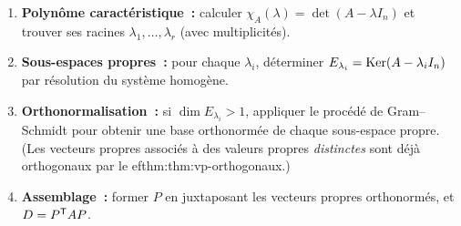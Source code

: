 \begin{enumerate}[label=\textbf{Étape \arabic*}.]
  \item \textbf{Polynôme caractéristique~:} calculer
    $\chi_A(\lambda) = \det(A - \lambda I_n)$ et trouver ses racines
    $\lambda_1, \ldots, \lambda_r$ (avec multiplicités).
  \item \textbf{Sous-espaces propres~:} pour chaque $\lambda_i$, déterminer
    $E_{\lambda_i} = \operatorname{Ker}(A - \lambda_i I_n)$ par résolution du système
    homogène.
  \item \textbf{Orthonormalisation~:} si $\dim E_{\lambda_i} > 1$,
    appliquer le procédé de Gram--Schmidt pour obtenir
    une base orthonormée de chaque sous-espace propre. (Les vecteurs
    propres associés à des valeurs propres \emph{distinctes} sont déjà
    orthogonaux par le 
ef{thm:thm:vp-orthogonaux}.)
  \item \textbf{Assemblage~:} former $P$ en juxtaposant les vecteurs
    propres orthonormés, et $D = {P}^{\mathsf{T}} A P$.
\end{enumerate}

